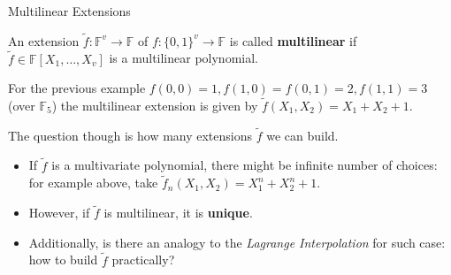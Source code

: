 \documentclass{zkdl-presentation-template}
\begin{document}
    \begin{frame}{Multilinear Extensions}
        \begin{definition}[MLE]
            An extension $\widetilde{f}: \mathbb{F}^v \to \mathbb{F}$ of $f:
            \{0,1\}^v \to \mathbb{F}$ is called \textbf{multilinear} if
            $\widetilde{f} \in \mathbb{F}[X_1,\dots,X_v]$ is a multilinear
            polynomial.\pause
        \end{definition}

        \begin{example}
            For the previous example $f(0,0)=1, f(1,0)=f(0,1)=2, f(1,1)=3$
            (over $\mathbb{F}_5$) the multilinear extension is given by
            $\widetilde{f}(X_1,X_2) = X_1 + X_2 + 1$.\pause
        \end{example}

        The question though is how many extensions $\widetilde{f}$ we can 
        build.
        \begin{itemize}
            \item If $\widetilde{f}$ is a multivariate polynomial, there might
            be infinite number of choices: for example above, take
            $\widetilde{f}_n(X_1,X_2) = X_1^n + X_2^n + 1$.\pause
            \item However, if $\widetilde{f}$ is multilinear, it is
            \textbf{unique}.\pause
            \item Additionally, is there an analogy to the \textit{Lagrange
            Interpolation} for such case: how to build $\widetilde{f}$
            practically?
        \end{itemize}
    \end{frame}
\end{document}
